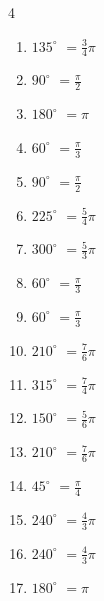 \begin{multicols}{4}
\begin{enumerate}
  \item $\displaystyle 135^{\circ}$
        $\displaystyle =\frac{3}{4}\pi$

  \item $\displaystyle 90^{\circ}$
        $\displaystyle =\frac{\pi}{2}$

  \item $\displaystyle 180^{\circ}$
        $\displaystyle =\pi$

  \item $\displaystyle 60^{\circ}$
        $\displaystyle =\frac{\pi}{3}$

  \item $\displaystyle 90^{\circ}$
        $\displaystyle =\frac{\pi}{2}$

  \item $\displaystyle 225^{\circ}$
        $\displaystyle =\frac{5}{4}\pi$

  \item $\displaystyle 300^{\circ}$
        $\displaystyle =\frac{5}{3}\pi$

  \item $\displaystyle 60^{\circ}$
        $\displaystyle =\frac{\pi}{3}$

  \item $\displaystyle 60^{\circ}$
        $\displaystyle =\frac{\pi}{3}$

  \item $\displaystyle 210^{\circ}$
        $\displaystyle =\frac{7}{6}\pi$

  \item $\displaystyle 315^{\circ}$
        $\displaystyle =\frac{7}{4}\pi$

  \item $\displaystyle 150^{\circ}$
        $\displaystyle =\frac{5}{6}\pi$

  \item $\displaystyle 210^{\circ}$
        $\displaystyle =\frac{7}{6}\pi$

  \item $\displaystyle 45^{\circ}$
        $\displaystyle =\frac{\pi}{4}$

  \item $\displaystyle 240^{\circ}$
        $\displaystyle =\frac{4}{3}\pi$

  \item $\displaystyle 240^{\circ}$
        $\displaystyle =\frac{4}{3}\pi$

  \item $\displaystyle 180^{\circ}$
        $\displaystyle =\pi$


\end{enumerate}
\end{multicols}
